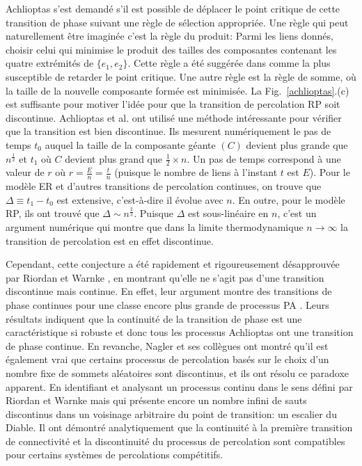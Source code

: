 Achlioptas s'est demandé s'il est possible de déplacer le point critique de cette transition de phase suivant une règle de sélection appropriée. Une règle qui peut naturellement être imaginée c'est la règle du produit: Parmi les liens donnés, choisir celui qui minimise le produit des tailles des composantes contenant les quatre extrémités de $\{e_1,e_2\}$. Cette règle a été suggérée dans \cite{Bollobas-1984} comme la plus susceptible de retarder le point critique. Une autre règle est la règle de somme, où la taille de la nouvelle composante formée est minimisée. La Fig.~\ref{achlioptas}.(c) est  suffisante pour motiver l'idée pour que la transition de percolation RP soit discontinue. Achlioptas et al. ont utilisé une méthode intéressante pour vérifier que la transition est bien discontinue. Ils mesurent numériquement le pas de temps $t_0$ auquel la taille de la composante géante $(C)$ devient plus grande que $n^{\frac{1}{2}}$ et $t_1$ où $C$ devient plus grand que $\frac{1}{2}\times n$. Un pas de temps correspond à une valeur de $r$ où $r=\frac{E}{n}=\frac{t}{n}$ (puisque le nombre de liens à l'instant $t$ est $E$). Pour le modèle ER et d'autres transitions de percolation continues, on trouve que $\Delta\equiv t_1-t_0$ est extensive, c'est-à-dire il évolue avec $n$. En outre, pour le modèle RP, ils ont trouvé que $\Delta\sim n^{\frac{2}{3}}$. Puisque $\Delta$ est sous-linéaire en $n$, c'est un argument numérique qui montre que dans la limite thermodynamique $n\rightarrow \infty$ la transition de percolation est en effet discontinue.

Cependant, cette conjecture a été rapidement et  rigoureusement désapprouvée par Riordan et Warnke \cite{Riordan-Warnke2011,Riordan-Warnke2012}, en montrant qu'elle ne s'agit pas d'une transition discontinue  mais continue. En effet, leur argument montre des transitions de phase continues pour une classe encore plus grande de processus PA \cite{Riordan-Warnke2012}. Leurs résultats indiquent que la continuité de la transition de phase est une caractéristique si robuste et donc tous les processus Achlioptas ont une transition de phase continue. En revanche, Nagler et ses collègues \cite{Nagler-al2012} ont montré qu'il est également vrai que certains processus de percolation basés sur le choix d'un nombre fixe de sommets aléatoires sont discontinus, et ils ont résolu ce paradoxe apparent. En identifiant et analysant un processus  continu dans le sens défini par Riordan et Warnke \cite{Riordan-Warnke2012} mais qui présente encore un nombre infini de sauts discontinus dans un voisinage arbitraire du point de transition: un escalier du Diable. Il ont démontré analytiquement que la continuité à la première transition de connectivité et la discontinuité du processus de percolation sont compatibles pour certains systèmes de percolations compétitifs.\\

